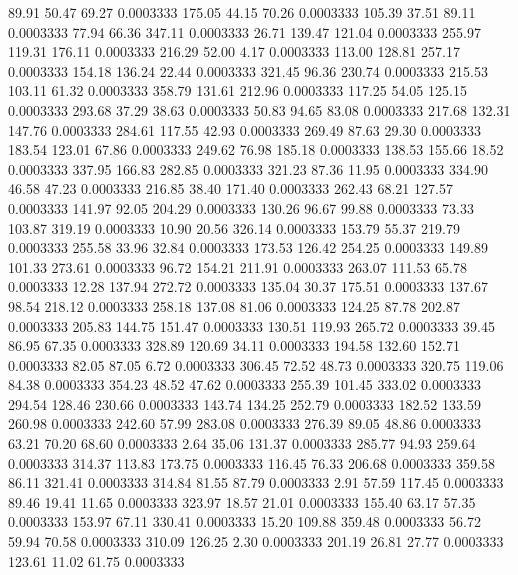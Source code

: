   89.91   50.47   69.27   0.0003333
 175.05   44.15   70.26   0.0003333
 105.39   37.51   89.11   0.0003333
  77.94   66.36  347.11   0.0003333
  26.71  139.47  121.04   0.0003333
 255.97  119.31  176.11   0.0003333
 216.29   52.00    4.17   0.0003333
 113.00  128.81  257.17   0.0003333
 154.18  136.24   22.44   0.0003333
 321.45   96.36  230.74   0.0003333
 215.53  103.11   61.32   0.0003333
 358.79  131.61  212.96   0.0003333
 117.25   54.05  125.15   0.0003333
 293.68   37.29   38.63   0.0003333
  50.83   94.65   83.08   0.0003333
 217.68  132.31  147.76   0.0003333
 284.61  117.55   42.93   0.0003333
 269.49   87.63   29.30   0.0003333
 183.54  123.01   67.86   0.0003333
 249.62   76.98  185.18   0.0003333
 138.53  155.66   18.52   0.0003333
 337.95  166.83  282.85   0.0003333
 321.23   87.36   11.95   0.0003333
 334.90   46.58   47.23   0.0003333
 216.85   38.40  171.40   0.0003333
 262.43   68.21  127.57   0.0003333
 141.97   92.05  204.29   0.0003333
 130.26   96.67   99.88   0.0003333
  73.33  103.87  319.19   0.0003333
  10.90   20.56  326.14   0.0003333
 153.79   55.37  219.79   0.0003333
 255.58   33.96   32.84   0.0003333
 173.53  126.42  254.25   0.0003333
 149.89  101.33  273.61   0.0003333
  96.72  154.21  211.91   0.0003333
 263.07  111.53   65.78   0.0003333
  12.28  137.94  272.72   0.0003333
 135.04   30.37  175.51   0.0003333
 137.67   98.54  218.12   0.0003333
 258.18  137.08   81.06   0.0003333
 124.25   87.78  202.87   0.0003333
 205.83  144.75  151.47   0.0003333
 130.51  119.93  265.72   0.0003333
  39.45   86.95   67.35   0.0003333
 328.89  120.69   34.11   0.0003333
 194.58  132.60  152.71   0.0003333
  82.05   87.05    6.72   0.0003333
 306.45   72.52   48.73   0.0003333
 320.75  119.06   84.38   0.0003333
 354.23   48.52   47.62   0.0003333
 255.39  101.45  333.02   0.0003333
 294.54  128.46  230.66   0.0003333
 143.74  134.25  252.79   0.0003333
 182.52  133.59  260.98   0.0003333
 242.60   57.99  283.08   0.0003333
 276.39   89.05   48.86   0.0003333
  63.21   70.20   68.60   0.0003333
   2.64   35.06  131.37   0.0003333
 285.77   94.93  259.64   0.0003333
 314.37  113.83  173.75   0.0003333
 116.45   76.33  206.68   0.0003333
 359.58   86.11  321.41   0.0003333
 314.84   81.55   87.79   0.0003333
   2.91   57.59  117.45   0.0003333
  89.46   19.41   11.65   0.0003333
 323.97   18.57   21.01   0.0003333
 155.40   63.17   57.35   0.0003333
 153.97   67.11  330.41   0.0003333
  15.20  109.88  359.48   0.0003333
  56.72   59.94   70.58   0.0003333
 310.09  126.25    2.30   0.0003333
 201.19   26.81   27.77   0.0003333
 123.61   11.02   61.75   0.0003333
